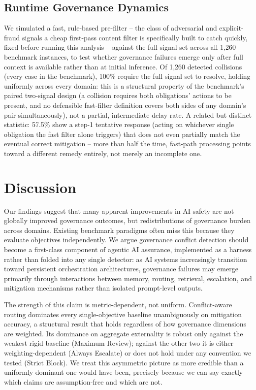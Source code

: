 \documentclass[letterpaper]{article} %
\begin{document}
\subsection{Runtime Governance Dynamics}
We simulated a fast, rule-based pre-filter -- the class of adversarial and explicit-fraud signals a cheap first-pass content filter is specifically built to catch quickly, fixed before running this analysis -- against the full signal set across all 1,260 benchmark instances, to test whether governance failures emerge only after full context is available rather than at initial inference. Of 1,260 detected collisions (every case in the benchmark), 100\% require the full signal set to resolve, holding uniformly across every domain: this is a structural property of the benchmark's paired two-signal design (a collision requires both obligations' actions to be present, and no defensible fast-filter definition covers both sides of any domain's pair simultaneously), not a partial, intermediate delay rate. A related but distinct statistic: 57.5\% show a step-1 tentative response (acting on whichever single obligation the fast filter alone triggers) that does not even partially match the eventual correct mitigation -- more than half the time, fast-path processing points toward a different remedy entirely, not merely an incomplete one.

\section{Discussion}
Our findings suggest that many apparent improvements in AI safety are not globally improved governance outcomes, but redistributions of governance burden across domains. Existing benchmark paradigms often miss this because they evaluate objectives independently. We argue governance conflict detection should become a first-class component of agentic AI assurance, implemented as a harness rather than folded into any single detector: as AI systems increasingly transition toward persistent orchestration architectures, governance failures may emerge primarily through interactions between memory, routing, retrieval, escalation, and mitigation mechanisms rather than isolated prompt-level outputs.

The strength of this claim is metric-dependent, not uniform. Conflict-aware routing dominates every single-objective baseline unambiguously on mitigation accuracy, a structural result that holds regardless of how governance dimensions are weighted. Its dominance on aggregate externality is robust only against the weakest rigid baseline (Maximum Review); against the other two it is either weighting-dependent (Always Escalate) or does not hold under any convention we tested (Strict Block). We treat this asymmetric picture as more credible than a uniformly dominant one would have been, precisely because we can say exactly which claims are assumption-free and which are not.
\end{document}
